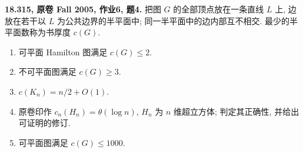\begin{exercise}\label{mit:18315-hw6-q4}
\textbf{18.315, 原卷 Fall 2005, 作业6, 题4.}
把图 $G$ 的全部顶点放在一条直线 $L$ 上, 边放在若干以 $L$ 为公共边界的半平面中;
同一半平面中的边内部互不相交. 最少的半平面数称为书厚度 $c(G)$.
\begin{enumerate}[label=(\alph*)]
\item 可平面 Hamilton 图满足 $c(G)\le2$.
\item 不可平面图满足 $c(G)\ge3$.
\item $c(K_n)=n/2+O(1)$.
\item 原卷印作 $c_n(H_n)=\theta(\log n)$, $H_n$ 为 $n$ 维超立方体;
判定其正确性, 并给出可证明的修订.
\item 可平面图满足 $c(G)\le1000$.
\end{enumerate}
\end{exercise}
